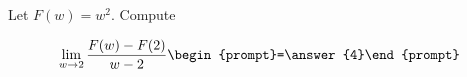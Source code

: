 \documentclass{ximera}
\author{Bart Snapp}
\begin{document}
\begin{exercise}
Let $F(w) = w^2$. Compute

\[
\lim_{ w\to 2 } 
\frac{F(w)-F(2)}{w-2} \begin{prompt}=\answer{4}\end{prompt}
\]
\end{exercise}
\end{document}
